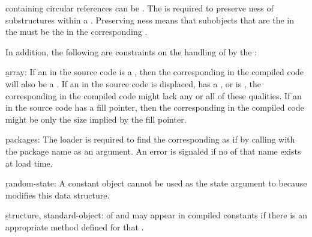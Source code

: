  containing circular references can 
be .
The  is required to preserve ness of 
substructures within a .
Preserving ness means that subobjects that are
the 
in the  must 
be
the 
in the corresponding .

In addition, the following are constraints on the handling of
 by the :
 
\beginlist

 \item{}\b{array:} If an  in the source code is a
, then the corresponding 
in the compiled code will also be a .  If
an  in the source code is displaced, has a 
, or is , the corresponding 
 in the compiled code might lack any or all of these
qualities. If an  in the source code has a fill
pointer, then the corresponding  in the compiled
code might be only the size implied by the fill pointer.

 \item{}\b{packages:} The loader is required to find the
corresponding   as if by calling 
 with the package name as an argument.  
An error  is signaled if no 
 of that name exists at load time.

 \item{}\b{random-state:} A constant 
object cannot be used as the state argument 
to  because  modifies this data structure.
 
\item{}\b{structure, standard-object:}
 of   and 
may appear in compiled constants if there is an
appropriate  method defined for that
.
 
